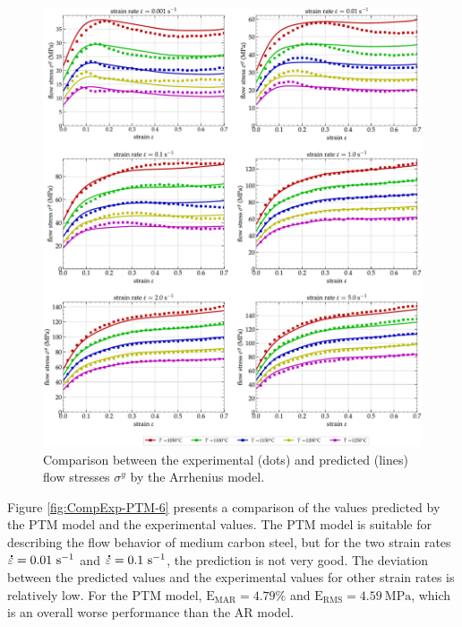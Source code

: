 \documentclass[metals,article,accept,pdftex,moreauthors]{Definitions/mdpi}
\DeclareRobustCommand{\mdot}[1]{\accentset{\mbox{\bfseries .}}{#1}}
\DeclareRobustCommand{\RMSE}{\text{E}_\text{RMS}}
\DeclareRobustCommand{\MARE}{\text{E}_\text{MAR}}
\DeclareRobustCommand{\ps}{\text{s}^{-1}}
\DeclareRobustCommand{\MPa}{\text{MPa}}
\begin{document}
\begin{figure}[H]

\includegraphics[width=0.98\columnwidth]
{Figures/CompExp-AR-6}
\caption{Comparison between the experimental (dots) and predicted (lines) flow stresses $\sigma^y$ by the Arrhenius model.}
\label{fig:CompExp-AR-6}
\end{figure}

Figure \ref{fig:CompExp-PTM-6} presents a comparison of the values predicted by the PTM model and the experimental values.
The PTM model is suitable for describing the flow behavior of medium carbon steel, but for the two strain rates $\mdot\varepsilon=0.01~\ps$ and $\mdot\varepsilon=0.1~\ps$, the prediction is not very good.
The deviation between the predicted values and the experimental values for other strain rates is relatively low.
For the PTM model, $\MARE=4.79\%$ and $\RMSE=4.59~\MPa$, which is an overall worse performance than the AR model.
\end{document}
